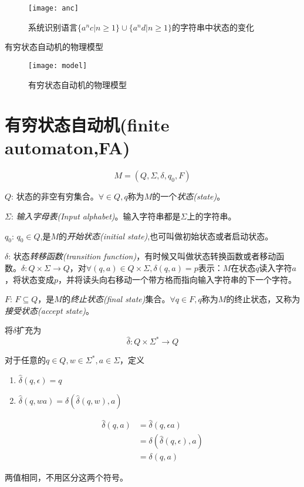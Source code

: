 \begin{figure}[htbp]
	\texttt{[image: anc]}
	\caption{系统识别语言$\{a^nc|n\ge 1\}\cup\{a^nd|n\ge 1\}$的字符串中状态的变化}
	\label{fig:anc}       %
\end{figure}

有穷状态自动机的物理模型
\begin{figure}[htbp]
	\texttt{[image: model]}
	\caption{有穷状态自动机的物理模型}
	\label{fig:model}       %
\end{figure}

\section{有穷状态自动机(finite automaton,FA)}
\[M=(Q,\Sigma,\delta,q_0,F)\]

$Q$: 状态的非空有穷集合。$\forall\in Q,q$称为$M$的一个\emph{状态(state)}。

$\Sigma$: \emph{输入字母表(Input alphabet)}。输入字符串都是$\Sigma$上的字符串。

$q_0$: $q_0\in Q$,是$M$的\emph{开始状态(initial state)},也可叫做初始状态或者启动状态。

$\delta$: 状态\emph{转移函数(transition function)}，有时候又叫做状态转换函数或者移动函数。$\delta: Q\times\Sigma\to Q$，对$\forall(q,a)\in Q\times\Sigma,\delta(q,a)=p$表示：$M$在状态$q$读入字符$a$，将状态变成$p$，并将读头向右移动一个带方格而指向输入字符串的下一个字符。

$F$: $F\subseteq Q$，是$M$的\emph{终止状态(final state)}集合。$\forall q\in F, q$称为$M$的终止状态，又称为\emph{接受状态(accept state)}。  

将$\delta$扩充为
\[\hat{\delta}: Q\times\Sigma^{\ast}\to Q\]

对于任意的$q\in Q, w\in\Sigma^{\ast}, a\in\Sigma$，定义
\begin{enumerate}
	\item $\hat{\delta}(q,\epsilon) = q$
	\item $\hat{\delta}(q,wa) = \delta(\hat{\delta}(q,w),a)$
\end{enumerate}
\begin{align*}
 \hat{\delta}(q,a) &= \hat{\delta}(q,\epsilon a) \\
 				   &= \delta(\hat{\delta}(q,\epsilon),a) \\
 				   &= \delta(q,a)
\end{align*}

两值相同，不用区分这两个符号。 

